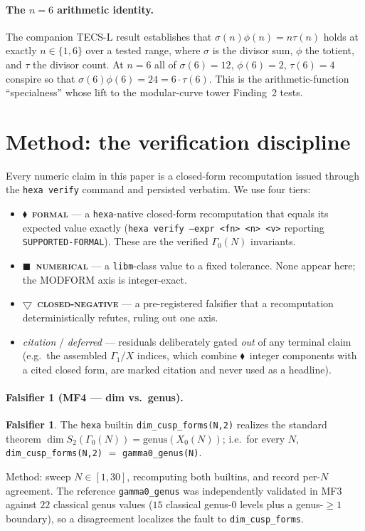 \documentclass[11pt,a4paper]{article}
\newcommand{\tierF}{\textcolor{blue!60!black}{$\blacklozenge$}}   %
\newcommand{\tierN}{\textcolor{green!50!black}{$\blacksquare$}}    %
\newcommand{\tierX}{\textcolor{red!70!black}{$\bigtriangledown$}}  %
\newcommand{\sig}{\sigma}
\newcommand{\Gz}{\Gamma_0}
\newcommand{\Go}{\Gamma_1}
\theoremstyle{definition}
\newtheorem{falsifier}{Falsifier}
\begin{document}
\paragraph{The $n=6$ arithmetic identity.} The companion TECS-L result
\citep{tecs-l-locus} establishes that $\sig(n)\phi(n)=n\tau(n)$ holds at exactly
$n\in\{1,6\}$ over a tested range, where $\sig$ is the divisor sum, $\phi$ the
totient, and $\tau$ the divisor count. At $n=6$ all of $\sig(6)=12$,
$\phi(6)=2$, $\tau(6)=4$ conspire so that $\sig(6)\phi(6)=24=6\cdot\tau(6)$. This
is the arithmetic-function ``specialness'' whose lift to the modular-curve tower
Finding~2 tests.

\section{Method: the verification discipline}
\label{sec:method}

Every numeric claim in this paper is a closed-form recomputation issued through
the \texttt{hexa verify} command and persisted verbatim. We use four tiers:

\begin{itemize}\itemsep0.25em
\item \tierF\ \textbf{\textsc{formal}} --- a \texttt{hexa}-native closed-form
recomputation that equals its expected value exactly
(\texttt{hexa verify --expr <fn> <n> <v>} reporting
\texttt{SUPPORTED-FORMAL}). These are the verified $\Gz(N)$ invariants.
\item \tierN\ \textbf{\textsc{numerical}} --- a \texttt{libm}-class value to a
fixed tolerance. None appear here; the MODFORM axis is integer-exact.
\item \tierX\ \textbf{\textsc{closed-negative}} --- a pre-registered falsifier
that a recomputation deterministically refutes, ruling out one axis.
\item \emph{citation} / \emph{deferred} --- residuals deliberately gated
\emph{out} of any terminal claim (e.g.\ the assembled $\Go/X$ indices, which
combine \tierF\ integer components with a cited closed form, are marked citation
and never used as a headline).
\end{itemize}

\paragraph{Falsifier 1 (MF4 --- dim vs.\ genus).}
\begin{falsifier}\label{fals:1}
The \texttt{hexa} builtin \texttt{dim\_cusp\_forms(N,2)} realizes the standard
theorem $\dim S_2(\Gz(N)) = \mathrm{genus}(X_0(N))$; i.e.\ for every $N$,
\texttt{dim\_cusp\_forms(N,2)} $=$ \texttt{gamma0\_genus(N)}.
\end{falsifier}
\noindent
Method: sweep $N\in[1,30]$, recomputing both builtins, and record per-$N$
agreement. The reference \texttt{gamma0\_genus} was independently validated in
MF3 against $22$ classical genus values ($15$ classical genus-$0$ levels plus a
genus-$\ge 1$ boundary), so a disagreement localizes the fault to
\texttt{dim\_cusp\_forms}.
\end{document}
